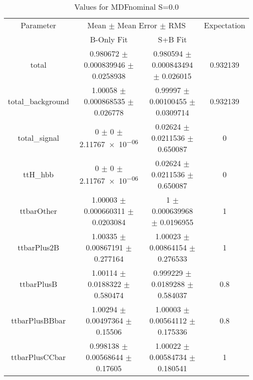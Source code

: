 \begin{table}
\centering
\caption{Values for MDFnominal S=0.0}
\begin{tabular}{cccc}
\toprule
Parameter & \multicolumn{2}{c}{Mean $\pm$ Mean Error $\pm$ RMS} & Expectation\\
 & B-Only Fit & S+B Fit & \\
\midrule
total & \num{0.980672} $\pm$ \num{0.000839946} $\pm$ \num{0.0258938} & \num{0.980594} $\pm$ \num{0.000843494} $\pm$ \num{0.026015} & \num{0.932139}\\
total\_background & \num{1.00058} $\pm$ \num{0.000868535} $\pm$ \num{0.026778} & \num{0.99997} $\pm$ \num{0.00100455} $\pm$ \num{0.0309714} & \num{0.932139}\\
total\_signal & \num{0} $\pm$ \num{0} $\pm$ \num{2.11767e-06} & \num{0.02624} $\pm$ \num{0.0211536} $\pm$ \num{0.650087} & \num{0}\\
ttH\_hbb & \num{0} $\pm$ \num{0} $\pm$ \num{2.11767e-06} & \num{0.02624} $\pm$ \num{0.0211536} $\pm$ \num{0.650087} & \num{0}\\
ttbarOther & \num{1.00003} $\pm$ \num{0.000660311} $\pm$ \num{0.0203084} & \num{1} $\pm$ \num{0.000639968} $\pm$ \num{0.0196955} & \num{1}\\
ttbarPlus2B & \num{1.00335} $\pm$ \num{0.00867191} $\pm$ \num{0.277164} & \num{1.00023} $\pm$ \num{0.00864154} $\pm$ \num{0.276533} & \num{1}\\
ttbarPlusB & \num{1.00114} $\pm$ \num{0.0188322} $\pm$ \num{0.580474} & \num{0.999229} $\pm$ \num{0.0189288} $\pm$ \num{0.584037} & \num{0.8}\\
ttbarPlusBBbar & \num{1.00294} $\pm$ \num{0.00497364} $\pm$ \num{0.15506} & \num{1.00003} $\pm$ \num{0.00564112} $\pm$ \num{0.175336} & \num{0.8}\\
ttbarPlusCCbar & \num{0.998138} $\pm$ \num{0.00568644} $\pm$ \num{0.17605} & \num{1.00022} $\pm$ \num{0.00584734} $\pm$ \num{0.180541} & \num{1}\\
\bottomrule
\end{tabular}
\end{table}